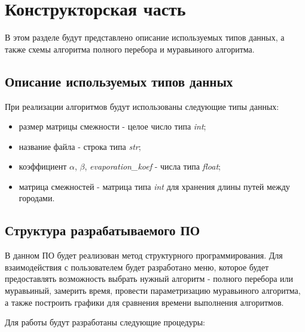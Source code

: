 \chapter{Конструкторская часть}
В этом разделе будут представлено описание используемых типов данных, а также схемы алгоритма полного перебора и муравьиного алгоритма.

\section{Описание используемых типов данных}

При реализации алгоритмов будут использованы следующие типы данных:

\begin{itemize}
	\item размер матрицы смежности - целое число типа \textit{int};
	\item название файла - строка типа \textit{str};
	\item коэффициент $\alpha$, $\beta$, \textit{evaporation\_koef} - числа типа \textit{float};
	\item матрица смежностей - матрица типа \textit{int} для хранения длины путей между городами.
\end{itemize}


\section{Структура разрабатываемого ПО}

В данном ПО будет реализован метод структурного программирования. Для взаимодействия с пользователем будет разработано меню, которое будет предоставлять возможность выбрать нужный алгоритм - полного перебора или муравьиный, замерить время, провести параметризацию муравьиного алгоритма, а также построить графики для сравнения времени выполнения алгоритмов. 

Для работы будут разработаны следующие процедуры:

